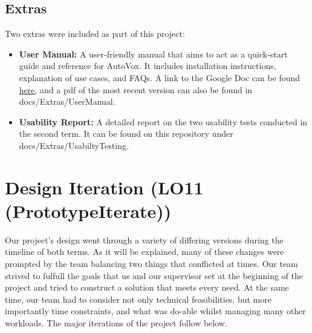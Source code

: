 \documentclass[12pt, titlepage]{article}
\begin{document}
\subsection{Extras}

Two extras were included as part of this project:
\begin{itemize}
  \item \textbf{User Manual:} A user-friendly manual that aims to act as a quick-start guide and reference for AutoVox. It includes installation instructions, explanation of use cases, and FAQs. A link to the Google Doc can be found \href{https://docs.google.com/document/d/1hXIdv2KOLxSW_-UiSePDmUuKd0TRGqq_F_Z74JUnhTE/edit?usp=sharing}{here,} and a pdf of the most recent version can also be found in docs/Extras/UserManual.
  \item \textbf{Usability Report:} A detailed report on the two usability tests conducted in the second term. It can be found on this repository under docs/Extras/UsabiltyTesting.
\end{itemize}

\section{Design Iteration (LO11 (PrototypeIterate))}

Our project's design went through a variety of differing versions during the timeline of 
both terms. As it will be explained, many of these changes were prompted by the team balancing
two things that conflicted at times. Our team strived to fulfull the goals that us and our 
supervisor set at the beginning of the project and tried to construct a solution that meets
every need. At the same time, our team had to consider not only technical feasibilities, but more
importantly time constraints, and what was do-able whilst managing many other workloads. The major
iterations of the project follow below.\\
\end{document}
